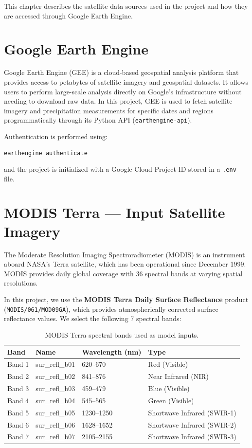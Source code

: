 \documentclass[12pt, a4paper]{report}
\begin{document}
This chapter describes the satellite data sources used in the project and how they are accessed through Google Earth Engine.

\section{Google Earth Engine}

Google Earth Engine (GEE) is a cloud-based geospatial analysis platform that provides access to petabytes of satellite imagery and geospatial datasets. It allows users to perform large-scale analysis directly on Google's infrastructure without needing to download raw data. In this project, GEE is used to fetch satellite imagery and precipitation measurements for specific dates and regions programmatically through its Python API (\texttt{earthengine-api}).

Authentication is performed using:
\begin{verbatim}
earthengine authenticate
\end{verbatim}
and the project is initialized with a Google Cloud Project ID stored in a \texttt{.env} file.

\section{MODIS Terra --- Input Satellite Imagery}

The Moderate Resolution Imaging Spectroradiometer (MODIS) is an instrument aboard NASA's Terra satellite, which has been operational since December 1999. MODIS provides daily global coverage with 36 spectral bands at varying spatial resolutions.

In this project, we use the \textbf{MODIS Terra Daily Surface Reflectance} product (\texttt{MODIS/061/MOD09GA}), which provides atmospherically corrected surface reflectance values. We select the following 7 spectral bands:

\begin{table}[H]
\centering
\begin{tabular}{@{}llll@{}}
\toprule
\textbf{Band} & \textbf{Name} & \textbf{Wavelength (nm)} & \textbf{Type} \\
\midrule
Band 1 & sur\_refl\_b01 & 620--670 & Red (Visible) \\
Band 2 & sur\_refl\_b02 & 841--876 & Near Infrared (NIR) \\
Band 3 & sur\_refl\_b03 & 459--479 & Blue (Visible) \\
Band 4 & sur\_refl\_b04 & 545--565 & Green (Visible) \\
Band 5 & sur\_refl\_b05 & 1230--1250 & Shortwave Infrared (SWIR-1) \\
Band 6 & sur\_refl\_b06 & 1628--1652 & Shortwave Infrared (SWIR-2) \\
Band 7 & sur\_refl\_b07 & 2105--2155 & Shortwave Infrared (SWIR-3) \\
\bottomrule
\end{tabular}
\caption{MODIS Terra spectral bands used as model inputs.}
\label{tab:modis_bands}
\end{table}
\end{document}
